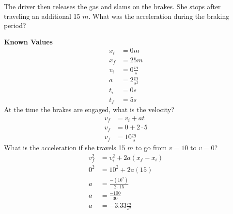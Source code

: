 \documentclass[12pt]{article}
\begin{document}
\begin{example}
  The driver then releases the gas and slams on the brakes. She stops after traveling an
  additional 15 $m$. What was the acceleration during the braking period?
  \begin{tcolorbox}[
    standard jigsaw, %
    colframe=fg,
    boxrule=0px,
    opacityback=0,
    sidebyside,
    lefthand width=75px,
    coltext=fg,
  ]
  \textbf{Known Values}
  \begin{align*}
    x_i &= 0m                \\
    x_f &= 25m               \\
    v_i &= 0 \frac{m}{s}     \\
    a   &= 2 \frac{m}{s^2}   \\
    t_i &= 0s                \\
    t_f &= 5s
  \end{align*}
  \tcblower
  At the time the brakes are engaged, what is the velocity?
  \begin{align*}
    v_f &= v_i+at         \\
    v_f &= 0+2 \cdot 5    \\
    v_f &= 10 \frac{m}{s}
  \end{align*}
  What is the acceleration if she travels 15 $m$ to go from $v=10$ to $v=0$?
  \begin{align*}
    v_f^2 &= v_i^2 + 2a(x_f-x_i)        \\
    0^2   &= 10^2 + 2a(15)              \\
    a     &= \frac{-(10^2)}{2 \cdot 15} \\
    a     &= \frac{-100}{30}            \\
    a     &= -3.33 \frac{m}{s^2}
  \end{align*}
  \end{tcolorbox}
\end{example}
\end{document}
